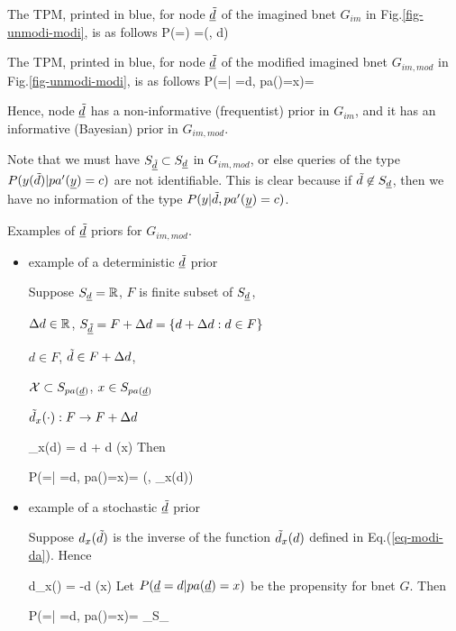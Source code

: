 The TPM, printed in  blue, for node $\underline{{\tilde{d}}}$
of the imagined bnet $G_{im}$ in Fig.\ref{fig-unmodi-modi}, is as follows
\beq\color{blue}
P(\ul{\tild}=\tild) =\delta(\tild, d)
\eeq

The TPM, printed in  blue, for node $\underline{{\tilde{d}}}$
of the modified imagined bnet $G_{im,mod}$ in Fig.\ref{fig-unmodi-modi},
 is as follows
\beq\color{blue}
P(\ul{\tild}=\tild | \rvd=d, pa(\rvd)=x)= 
\eeq

Hence, node $\underline{{\tilde{d}}}$
has a non-informative (frequentist) prior in $G_{im}$,
and it has an informative (Bayesian) prior in $G_{im,mod}$.

Note that we must have $S_{\underline{{\tilde{d}}}}\subset S_{\underline{d}}$ in $G_{im,mod}$,
or else queries of the type
 $P(y({\tilde{d}})|pa'({\underline{y}})=c)$ are not identifiable.
This is clear because if ${\tilde{d}}\not\in S_{\underline{d}}$,
then we have no information of the type $P(y|{\tilde{d}}, pa'({\underline{y}})=c)$.


Examples of $\underline{{\tilde{d}}}$ priors for $G_{im,mod}$.
\begin{itemize}
\item example of a deterministic $\underline{{\tilde{d}}}$  prior

Suppose
$S_{\underline{d}}={ \mathbb{R}}$,
$F$ is finite subset of $S_{\underline{d}}$,

$\Delta d\in { \mathbb{R}}$,
$S_{\underline{{\tilde{d}}}}= F+\Delta d = \{d+\Delta d: d\in F\}$

$d\in F$, ${\tilde{d}}\in F+\Delta d$,

${\cal X}\subset S_{pa({\underline{d}})}$, $x\in S_{pa({\underline{d}})}$

${\tilde{d}}_x(\cdot):F\rightarrow F+\Delta d$

\beq
\tild_x(d) = d + \Delta d \;\indi(x\in \calx)
\label{eq-modi-da}
\eeq
Then

\beq\color{blue}
P(\ul{\tild}=\tild | \rvd=d, pa(\rvd)=x)= \delta(\tild, \tild_x(d))
\eeq

\item example of a stochastic $\underline{{\tilde{d}}}$  prior

Suppose $d_x({\tilde{d}})$ is the inverse of
the function ${\tilde{d}}_x(d)$ defined in Eq.(\ref{eq-modi-da}).
Hence

\beq
d_x(\tild) = \tild -\Delta d \;\indi(x\in \calx)
\eeq
Let $P({\underline{d}}=d |pa({\underline{d}})=x)$ be the propensity for bnet $G$.
Then

\beq\color{blue}
P(\ul{\tild}=\tild | \rvd=d, pa(\rvd)=x)=
{\sum_{\tild\in S_{\ul{\tild}}} }
\eeq


\end{itemize}
